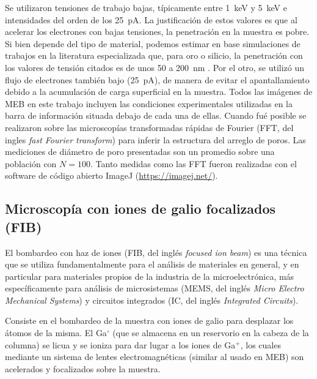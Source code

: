 		Se utilizaron tensiones de trabajo bajas, típicamente entre \SI{1}{\kilo\electronvolt} y \SI{5}{\kilo\electronvolt} e intensidades del orden de los \SI{25}{\pA}. La justificación de estos valores es que al acelerar los electrones con bajas tensiones, la penetración en la muestra es pobre. Si bien depende del tipo de material, podemos estimar en base simulaciones de trabajos en la literatura especializada que, para oro o silicio, la penetración con los valores de tensión citados es de unos 50 a \SI{200}{\nm} \cite{Joy1984,Shur2012,Hafner2007}. Por el otro, se utilizó un flujo de electrones también bajo (\SI{25}{\pA}), de manera de evitar el apantallamiento debido a la acumulación de carga superficial en la muestra. Todos las imágenes de MEB en este trabajo incluyen las condiciones experimentales utilizadas en la barra de información situada debajo de cada una de ellas. Cuando fué posible se realizaron sobre las microscopías transformadas rápidas de Fourier (FFT, del ingles \textit{fast Fourier transform}) para inferir la estructura del arreglo de poros. Las mediciones de diámetro de poro presentadas son un promedio sobre una población con $N=100$. Tanto  medidas como las FFT fueron realizadas con el software de código abierto ImageJ (\url{https://imagej.net/})\cite{ImageJ2012}.	
					
	\subsection{Microscopía con iones de galio focalizados (FIB)}\label{sec:FIB}

		El bombardeo con haz de iones (FIB, del inglés \textit{focused ion beam}) es una técnica que se utiliza fundamentalmente para el análisis de materiales en general, y en particular para materiales propios de la industria de la microelectrónica, más específicamente para análisis de microsistemas (MEMS, del inglés \textit{Micro Electro Mechanical Systems}) y circuitos integrados (IC, del inglés \textit{Integrated Circuits}). 

		Consiste en el bombardeo de la muestra con iones de galio para desplazar los átomos de la misma. El Ga$^{\circ}$ (que se almacena en un	reservorio en la cabeza de la columna) se licua y se ioniza para dar lugar a los iones de Ga${^+}$, los cuales mediante un sistema de lentes electromagnéticas (similar al usado en MEB) son acelerados y focalizados sobre la muestra. 

